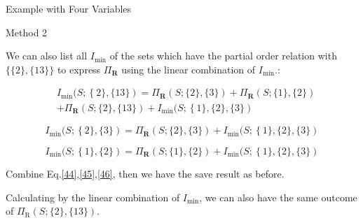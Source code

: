 \begin{frame}{Example with Four Variables}

\begin{block}{Method 2}


We can also list all $I_{\min}$ of the sets which have the partial order relation with $\{\{2\},\{13\}\}$ to express $\Pi_{\mathbf{R}}$ using the linear combination of $I_{\min}$.:

\begin{equation}
\begin{aligned}
&I_{\min }(S;\left\{2\},\{13\}\right)=\Pi_{\mathbf{R}}(S ;\{2\},\{3\})+\Pi_{\mathbf{R}}(S ;\{1\},\{2\}) \\ &+\Pi_{\mathbf{R}}(S ;\{2\},\{13\})+I_{\min }(S;\left\{1\},\{2\},\{3\}\right)\label{44}
\end{aligned}\end{equation}

\begin{equation}I_{\min }(S;\left\{2\},\{3\}\right)=\Pi_{\mathbf{R}}(S ;\{2\},\{3\})+I_{\min }(S;\left\{1\},\{2\},\{3\}\right)\label{45}\end{equation}

\begin{equation}I_{\min }(S;\left\{1\},\{2\}\right)=\Pi_{\mathbf{R}}(S ;\{1\},\{2\})+I_{\min }(S;\left\{1\},\{2\},\{3\}\right)\label{46}\end{equation}

Combine Eq.\ref{44},\ref{45},\ref{46}, then we have the save result as before.

Calculating by the linear combination of $I_{\min}$, we can also have the same outcome of $\Pi_{\mathrm{R}}(S ; \{2\},\{13\})$.\\
\end{block}
\end{frame}